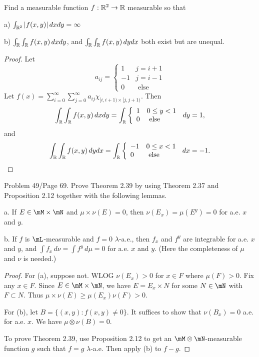 \documentclass{article}
\begin{document}
 Find a measurable function $f: \mathbb{R}^2 \to \mathbb{R}$ measurable so that

a) $\int_{\mathbb{R}^2} |f(x,y)| \, dx dy = \infty$

b) $\int_{\mathbb{R}} \int _{\mathbb{R}} f(x,y) \, dx dy$, and $\int_{\mathbb{R}} \int_{\mathbb{R}} f(x,y) \, dy dx$ both exist but are unequal.

\begin{proof}
Let 
$$a_{ij} = \left\{ \begin{array}{ll}
1 & j = i+1
\\ -1 & j = i-1
\\ 0 & \text{ else }
\end{array} \right.$$
Let $f(x) = \sum_{i=0}^\infty \sum_{j=0}^\infty a_{ij} \chi_{[i, i+1) \times [j, j+1)}$.  
Then 
$$\int_{\mathbb{R}} \int _{\mathbb{R}} f(x,y) \, dx dy = \int_{\mathbb{R}}  \left\{ \begin{array}{ll}
1 & 0 \le y < 1
\\ 0 & \text{ else }
\end{array} \right. \, dy
= 1,$$
and
$$\int_{\mathbb{R}} \int _{\mathbb{R}} f(x,y) \, dy dx = \int_{\mathbb{R}}  \left\{ \begin{array}{ll}
-1 & 0 \le x < 1
\\ 0 & \text{ else }
\end{array} \right. \, dx
= -1.$$
\end{proof}

 Problem 49/Page 69. Prove Theorem 2.39 by using Theorem 2.37 and Proposition 2.12 together with the following lemmas.

a. If $E \in \mM \times \mN$ and $\mu \times \nu(E) = 0$, then $\nu(E_x) = \mu(E^y) = 0$ for a.e. $x$ and $y$.

b. If $f$ is $\mL$-measurable and $f = 0$ $\lambda$-a.e., then $f_x$ and $f^y$ are integrable for a.e. $x$ and $y$, and $\int f_x \, d\nu = \int f^y \, d\mu = 0$ for a.e. $x$ and $y$. (Here the completeness of $\mu$ and $\nu$ is needed.)

\begin{proof}
For (a), suppose not.  WLOG $\nu(E_x) > 0$ for $x \in F$ where $\mu(F) > 0$.  Fix any $x \in F$. Since $E \in \mM \times \mN$, we have $E = E_x \times N$ for some $N \in \mN$ with $F \subset N$. Thus $\mu \times \nu(E) \ge \mu(E_x)\nu(F) > 0$.

For (b), let $B = \{(x,y) : f(x,y) \neq 0\}$. It suffices to show that $\nu(B_x) = 0$ a.e. for a.e. $x$. We have $\mu \otimes \nu(B) = 0$.

To prove Theorem 2.39, use Proposition 2.12 to get an $\mM \otimes \mN$-measurable function $g$ such that $f = g$ $\lambda$-a.e.  Then apply (b) to $f - g$.
\end{proof}
\end{document}
